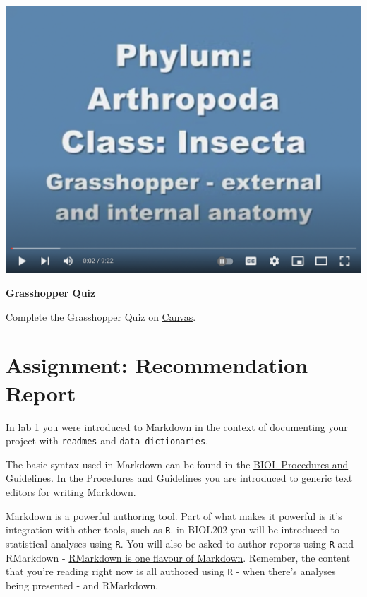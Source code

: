 \documentclass[
]{book}
\begin{document}
\includegraphics{images/Lab4_Grasshopper_Dissection_Video1.png}

\textbf{Grasshopper Quiz}

Complete the Grasshopper Quiz on \href{https://canvas.ubc.ca/}{Canvas}.

\hypertarget{assignment-recommendation-report}{%
\chapter*{Assignment: Recommendation Report}\label{assignment-recommendation-report}}

\href{https://ubco-biology.github.io/Procedures-and-Guidelines/readme-files-and-data-dictionaries.html\#markdown}{In lab 1 you were introduced to Markdown} in the context of documenting your project with \texttt{readmes} and \texttt{data-dictionaries}.

The basic syntax used in Markdown can be found in the \href{https://ubco-biology.github.io/Procedures-and-Guidelines/markdown-1.html}{BIOL Procedures and Guidelines}. In the Procedures and Guidelines you are introduced to generic text editors for writing Markdown.

Markdown is a powerful authoring tool. Part of what makes it powerful is it's integration with other tools, such as \texttt{R}. in BIOL202 you will be introduced to statistical analyses using \texttt{R}. You will also be asked to author reports using \texttt{R} and RMarkdown - \href{https://ubco-biology.github.io/Procedures-and-Guidelines/markdown-flavours.html}{RMarkdown is one flavour of Markdown}. Remember, the content that you're reading right now is all authored using \texttt{R} - when there's analyses being presented - and RMarkdown.
\end{document}
